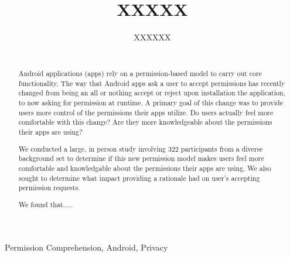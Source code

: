 \documentclass{sig-alternate-05-2015}
\begin{document}
\title{XXXXX}

\author{
%
\alignauthor
XXXXXX 	\\
       \\
       \alignauthor
} %




\maketitle
\begin{abstract}



Android applications (apps) rely on a permission-based model to carry
out core functionality. The way that Android apps ask a user to accept
permissions has recently changed from being an all or nothing accept
or reject upon installation the application, to now asking for
permission at runtime. A primary goal of this change was to provide
users more control of the permissions their apps utilize. Do users
actually feel more comfortable with this change? Are they more
knowledgeable about the permissions their apps are using?

We conducted a large, in person study involving 322 participants from a diverse background
set to determine if this new permission model makes users feel more
comfortable and knowledgable about the permissions their apps are
using. We also sought to determine what impact providing a rationale
had on user's accepting permission requests.

We found that.....





\end{abstract}

\begin{keywords}

Permission Comprehension, Android, Privacy

\end{keywords}
\end{document}
